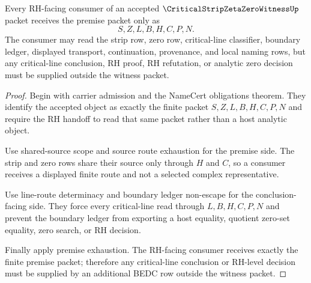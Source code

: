\begin{theorem}
\label{thm:critical-strip-zeta-zero-premise-consumer-separation}
Every RH-facing consumer of an accepted $\CriticalStripZetaZeroWitnessUp$ packet receives the premise packet only as
$$
S,Z,L,B,H,C,P,N.
$$
The consumer may read the strip row, zero row, critical-line classifier, boundary ledger, displayed transport, continuation, provenance, and local naming rows, but any critical-line conclusion, RH proof, RH refutation, or analytic zero decision must be supplied outside the witness packet.
\end{theorem}
\begin{proof}
Begin with carrier admission and the NameCert obligations theorem. They identify the accepted object as exactly the finite packet $S,Z,L,B,H,C,P,N$ and require the RH handoff to read that same packet rather than a host analytic object.

Use shared-source scope and source route exhaustion for the premise side. The strip and zero rows share their source only through $H$ and $C$, so a consumer receives a displayed finite route and not a selected complex representative.

Use line-route determinacy and boundary ledger non-escape for the conclusion-facing side. They force every critical-line read through $L,B,H,C,P,N$ and prevent the boundary ledger from exporting a host equality, quotient zero-set equality, zero search, or RH decision.

Finally apply premise exhaustion. The RH-facing consumer receives exactly the finite premise packet; therefore any critical-line conclusion or RH-level decision must be supplied by an additional BEDC row outside the witness packet.
\end{proof}

